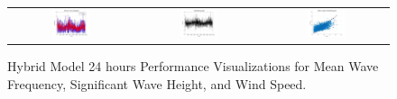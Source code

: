 \begin{figure}[ht!]
\begin{tabular}{ccc}
    \includegraphics[width=0.32\textwidth]{graphs/hybrid/24 hours/wind_speed/actual vs forecast.jpg} &
    \includegraphics[width=0.32\textwidth]{graphs/hybrid/24 hours/wind_speed/residuals.jpg} &
    \includegraphics[width=0.32\textwidth]{graphs/hybrid/24 hours/wind_speed/scatter plot.jpg} \\
  \end{tabular}
  \caption{Hybrid Model 24 hours Performance Visualizations for Mean Wave Frequency, Significant Wave Height, and Wind Speed.}
  \label{fig:hybrid_24_hours}
\end{figure}


